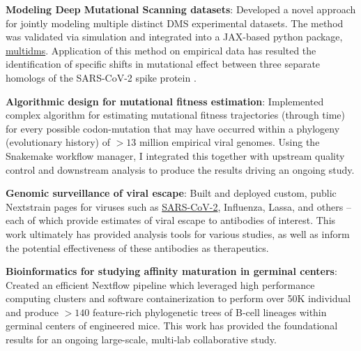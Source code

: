 \documentclass[letterpaper,9pt]{article}
\newcommand{\resumeItem}[2]{
  \begin{minipage}[t]{0.92\textwidth}
    \linespread{0.85}\selectfont
    \vspace{.1cm}\item\small{
      \textbf{#1}{: #2 \vspace{1pt}}
    }
  \end{minipage}
}
\begin{document}
                \resumeItem{Modeling Deep Mutational Scanning datasets}
                    {
                        Developed a novel approach for jointly modeling multiple distinct
                        DMS experimental datasets. The method was validated via simulation 
                        and integrated into a JAX-based python package,
                        \href{https://matsengrp.github.io/multidms/}{multidms}.
                        Application of this method on empirical data has resulted the 
                        identification of specific shifts in mutational
                        effect between three separate homologs of the SARS-CoV-2 spike protein \cite{Haddox_2023}.
                    }
                \resumeItem{Algorithmic design for mutational fitness estimation}
                    {
                        Implemented complex algorithm for 
                        estimating mutational fitness trajectories (through time) for 
                        every possible codon-mutation that may have occurred 
                        within a phylogeny (evolutionary history) of $>13$ million empirical viral genomes.
                        Using the Snakemake workflow manager, I integrated this
                        together with upstream quality control
                        and downstream analysis
                        to produce the results driving an ongoing study.
                    }
                \resumeItem{Genomic surveillance of viral escape}
                    {
                        Built and deployed custom, public Nextstrain pages for viruses such as 
                        \href{https://nextstrain.org/groups/dms-phenotype/ncov/Dadonaite-2023-Cell}{SARS-CoV-2},
                        Influenza, Lassa, and others 
                        -- each of which provide estimates of viral escape to antibodies of interest.
                        This work ultimately has provided analysis tools for various studies,
                        as well as inform the potential effectiveness of these antibodies as therapeutics.
                    }
                \resumeItem{Bioinformatics for studying affinity maturation in germinal centers}
                    {
                        Created an efficient Nextflow pipeline 
                        which leveraged high performance computing clusters and
                        software containerization to perform over 50K individual
                        and produce $>140$ feature-rich phylogenetic trees 
                        of B-cell lineages within germinal centers of engineered mice.
                        This work has provided the foundational results for an ongoing large-scale, 
                        multi-lab collaborative study.
                    }
\end{document}
